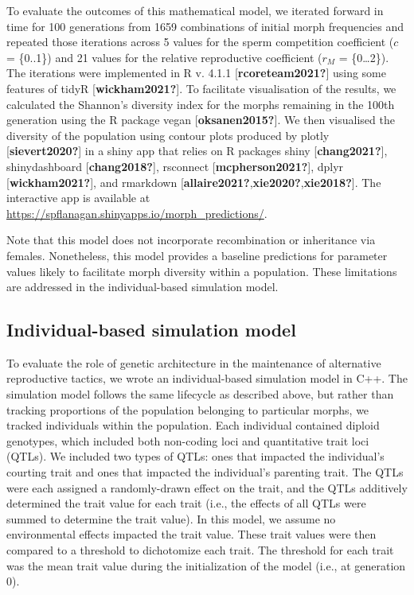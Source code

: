 \documentclass[
  11pt,
]{article}
\begin{document}
To evaluate the outcomes of this mathematical model, we iterated forward
in time for 100 generations from 1659 combinations of initial morph
frequencies and repeated those iterations across 5 values for the sperm
competition coefficient (\(c\) = \{0..1\}) and 21 values for the relative
reproductive coefficient (\(r_M\) = \{0\ldots2\}). The iterations were
implemented in R v. 4.1.1 {[}\textbf{rcoreteam2021?}{]} using some features of tidyR
{[}\textbf{wickham2021?}{]}. To facilitate visualisation of the results, we
calculated the Shannon's diversity index for the morphs remaining in the
100th generation using the R package vegan {[}\textbf{oksanen2015?}{]}. We then
visualised the diversity of the population using contour plots produced
by plotly {[}\textbf{sievert2020?}{]} in a shiny app that relies on R packages shiny
{[}\textbf{chang2021?}{]}, shinydashboard {[}\textbf{chang2018?}{]}, rsconnect {[}\textbf{mcpherson2021?}{]},
dplyr {[}\textbf{wickham2021?}{]}, and rmarkdown {[}\textbf{allaire2021?},\textbf{xie2020?},\textbf{xie2018?}{]}.
The interactive app is available at
\url{https://spflanagan.shinyapps.io/morph_predictions/}.

Note that this model does not incorporate recombination or inheritance
via females. Nonetheless, this model provides a baseline predictions for
parameter values likely to facilitate morph diversity within a
population. These limitations are addressed in the individual-based
simulation model.

\hypertarget{individual-based-simulation-model}{%
\subsection{Individual-based simulation model}\label{individual-based-simulation-model}}

To evaluate the role of genetic architecture in the maintenance of
alternative reproductive tactics, we wrote an individual-based
simulation model in C++. The simulation model follows the same lifecycle
as described above, but rather than tracking proportions of the
population belonging to particular morphs, we tracked individuals within
the population. Each individual contained diploid genotypes, which
included both non-coding loci and quantitative trait loci (QTLs). We
included two types of QTLs: ones that impacted the individual's courting
trait and ones that impacted the individual's parenting trait. The QTLs
were each assigned a randomly-drawn effect on the trait, and the QTLs
additively determined the trait value for each trait (i.e., the effects
of all QTLs were summed to determine the trait value). In this model, we
assume no environmental effects impacted the trait value. These trait
values were then compared to a threshold to dichotomize each trait. The
threshold for each trait was the mean trait value during the
initialization of the model (i.e., at generation 0).
\end{document}
